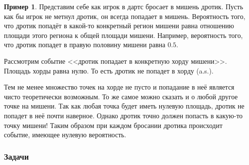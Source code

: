 \documentclass[pdftex, 12pt, a4paper]{article}
\theoremstyle{definition} %
\newtheorem{myex}{Пример}
\numberwithin{problem}{section}
\numberwithin{blits}{section}
\begin{document}
\begin{myex}
Представим себе как игрок в дартс бросает в мишень дротик. Пусть как бы игрок не метнул дротик, он всегда попадает в мишень. Вероятность того, что дротик попадёт в какой-то конкретный регион мишени равна отношению площади этого региона к общей площади мишени. Например, вероятность того, что дротик попадет в правую половину мишени равна $0.5$. 

Рассмотрим событие <<дротик попадает в конкретную хорду мишени>>. Площадь хорды равна нулю. То есть дротик не попадет в хорду (a.s.).

Тем не менее множество точек на хорде не пусто и попадание в неё является чисто теоретически возможным. То же самое можно сказать и о любой другое точке на мишени. Так как любая точка будет иметь нулевую площадь, дротик не попадет в неё почти наверное. Однако дротик точно должен попасть в какую-то точку мишени! Таким образом при каждом бросании дротика происходит событие, имеющее нулевую вероятность.
\end{myex}


\subsubsection*{Задачи}
\end{document}
